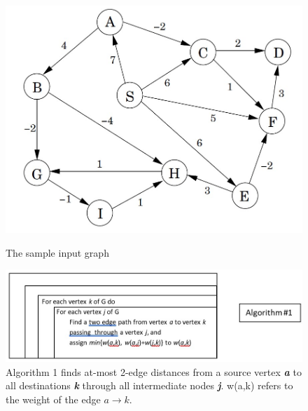 \documentclass[a4paper]{article}
\begin{document}
\begin{figure}[h!]
    \centering
    \begin{minipage}{0.6\textwidth}
        \centering
        \includegraphics[width=\textwidth]{graph.jpg}
        \caption{The sample input graph}
        \label{fig:graph}
    \end{minipage}

    \vspace{1em} %

    \begin{minipage}{0.9\textwidth}
        \centering
        \includegraphics[width=\textwidth]{algo1.jpg}
        \caption{Algorithm 1 finds at-most 2-edge distances from a source vertex \textit{\textbf{a}} to all destinations \textbf{\textit{k}} through all intermediate nodes \textbf{\textit{j}}. w(a,k) refers to the weight of the edge $a\xrightarrow{}k$.}
        \label{fig:algo1}
    \end{minipage}

    \vspace{1em} %


\end{figure}
\end{document}
